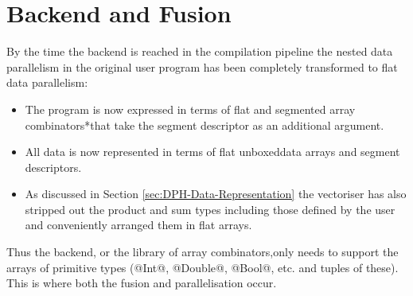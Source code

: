 \documentclass[preamble.tex]{subfiles}
\begin{document}
\clearpage

\section{Backend and Fusion}

By the time the backend is reached in the compilation pipeline the nested data parallelism in the original user program has been completely transformed to flat data parallelism:
\begin{itemize}
\item The program is now expressed in terms of flat and \*segmented array combinators*\isegcomb that take the segment descriptor as an additional argument.
\item All data is now represented in terms of flat unboxed\iboxing data arrays and segment descriptors.\isegd
\item As discussed in Section \ref{sec:DPH-Data-Representation} the vectoriser has also stripped out the product and sum types including those defined by the user and conveniently arranged them in flat arrays.
\end{itemize}

Thus the backend, or the library of array combinators,\icomb only needs to support the arrays of primitive types (@Int@, @Double@, @Bool@, etc. and tuples of these). This is where both the fusion and parallelisation occur.


\end{document}
